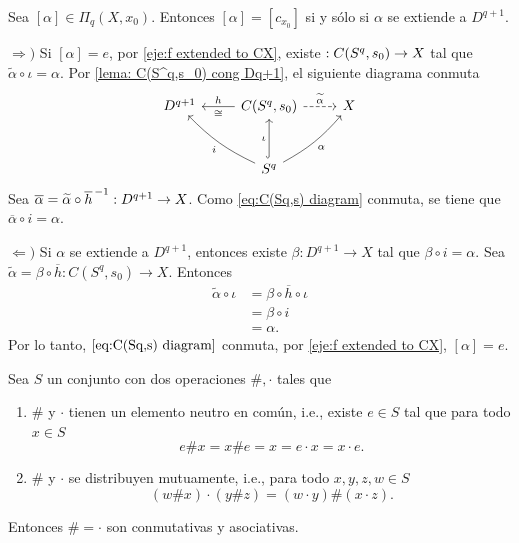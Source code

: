 \begin{prop}
    Sea $[\alpha]\in\Pi_q(X,x_0)$. Entonces $[\alpha]=[c_{x_0}]$ si y sólo si $\alpha$ se extiende a $D^{q+1}.$
\end{prop}
\begin{dem}
    $\Rightarrow)$ Si $[\alpha]=e$, por \ref{eje:f extended to CX}, existe $\title{\alpha}:C(S^q,s_0)\to X$ tal que $\widetilde{\alpha}\circ \iota=\alpha$. Por \ref{lema: C(S^q,s_0) cong Dq+1}, el siguiente diagrama conmuta
    \begin{equation}
    \label{eq:C(Sq,s) diagram}
        \begin{tikzcd}[row sep = 1cm]
            D^{q+1} &\arrow[l,"h"', "\cong"] C(S^q,s_0) \arrow[r,dashed, "\widetilde{\alpha}"] & X \\
                & S^q\arrow[ul, bend left=10, "i"] \arrow[ur, bend right=10, "\alpha"']\arrow[u, hook, "\iota"]& 
        \end{tikzcd}
    \end{equation}
    Sea $\overline{\alpha}=\widetilde{\alpha}\circ \overline{h}^{\hspace{0.5mm}-1}:D^{q+1}\to X$. Como \ref{eq:C(Sq,s) diagram} conmuta, se tiene que $\overline{\alpha}\circ i=\alpha$. 

    $\Leftarrow)$ Si $\alpha$ se extiende a $D^{q+1}$, entonces existe $\beta:D^{q+1}\to X$ tal que $\beta\circ i=\alpha$. Sea $\widetilde{\alpha}=\beta\circ\overline{h}:C(S^q,s_0)\to X$. Entonces
    \begin{align*}
        \widetilde{\alpha}\circ\iota &=\beta\circ \overline{h}\circ \iota\\
        &=\beta\circ i\\
        &=\alpha.
    \end{align*}
    Por lo tanto, $\ref{eq:C(Sq,s) diagram}$ conmuta, por \ref{eje:f extended to CX}, $[\alpha]=e$.
\end{dem}
\begin{prop}
\label{prop: dot and cat distributive}
    Sea $S$ un conjunto con dos operaciones $\#,\cdot$ tales que
    \begin{enumerate}[label=(\arabic*)]    
        \item  $\#$ y $\cdot$ tienen un elemento neutro en común, i.e., existe $e\in S$ tal que para todo $x\in S$
        \begin{equation*}
            e\# x=x\#e=x=e\cdot x=x\cdot e.
        \end{equation*}
        \item  $\#$ y $\cdot$ se distribuyen mutuamente, i.e., para todo $x,y,z,w\in S$
        \begin{equation*}
            (w\#x)\cdot(y\#z)=(w\cdot y)\#(x\cdot z).
        \end{equation*}
    \end{enumerate}
    Entonces $\#=\cdot$ son conmutativas y asociativas.
\end{prop}
